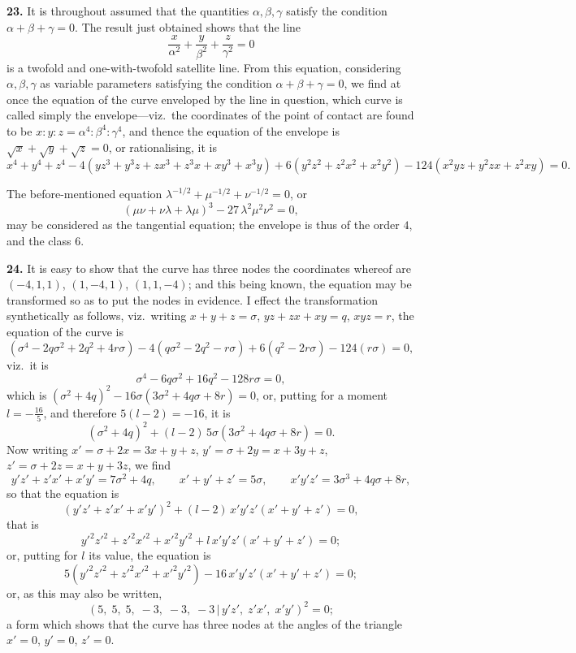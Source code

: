 \documentclass[11pt,a4paper]{article}
\providecommand{\mid}{\,|\,}
\begin{document}
\medskip

\textbf{23.} It is throughout assumed that the quantities $\alpha, \beta, \gamma$ satisfy the condition $\alpha + \beta + \gamma = 0$. The result just obtained shows that the line
\[
\frac{x}{\alpha^2} + \frac{y}{\beta^2} + \frac{z}{\gamma^2} = 0
\]
is a twofold and one-with-twofold satellite line. From this equation, considering $\alpha, \beta, \gamma$ as variable parameters satisfying the condition $\alpha + \beta + \gamma = 0$, we find at once the equation of the curve enveloped by the line in question, which curve is called simply the envelope---viz.\ the coordinates of the point of contact are found to be $x : y : z = \alpha^4 : \beta^4 : \gamma^4$, and thence the equation of the envelope is $\sqrt{x} + \sqrt{y} + \sqrt{z} = 0$, or rationalising, it is
\[
x^4 + y^4 + z^4 - 4(yz^3 + y^3 z + zx^3 + z^3 x + xy^3 + x^3 y) + 6(y^2 z^2 + z^2 x^2 + x^2 y^2) - 124(x^2 yz + y^2 zx + z^2 xy) = 0.
\]

The before-mentioned equation $\lambda^{-1/2} + \mu^{-1/2} + \nu^{-1/2} = 0$, or
\[
(\mu\nu + \nu\lambda + \lambda\mu)^3 - 27\,\lambda^2\mu^2\nu^2 = 0,
\]
may be considered as the tangential equation; the envelope is thus of the order $4$, and the class $6$.

\medskip

\textbf{24.} It is easy to show that the curve has three nodes the coordinates whereof are $(-4, 1, 1)$, $(1, -4, 1)$, $(1, 1, -4)$; and this being known, the equation may be transformed so as to put the nodes in evidence. I effect the transformation synthetically as follows, viz.\ writing $x + y + z = \sigma$, $yz + zx + xy = q$, $xyz = r$, the equation of the curve is
\[
(\sigma^4 - 2q\sigma^2 + 2q^2 + 4r\sigma) - 4(q\sigma^2 - 2q^2 - r\sigma) + 6(q^2 - 2r\sigma) - 124(r\sigma) = 0,
\]
viz.\ it is
\[
\sigma^4 - 6q\sigma^2 + 16q^2 - 128 r\sigma = 0,
\]
which is $(\sigma^2 + 4q)^2 - 16\sigma(3\sigma^2 + 4q\sigma + 8r) = 0$, or, putting for a moment $l = -\tfrac{16}{5}$, and therefore $5(l - 2) = -16$, it is
\[
(\sigma^2 + 4q)^2 + (l - 2)\,5\sigma(3\sigma^2 + 4q\sigma + 8r) = 0.
\]
Now writing $x' = \sigma + 2x = 3x + y + z$, $y' = \sigma + 2y = x + 3y + z$, $z' = \sigma + 2z = x + y + 3z$, we find
\[
y'z' + z'x' + x'y' = 7\sigma^2 + 4q,\qquad x' + y' + z' = 5\sigma,\qquad x'y'z' = 3\sigma^3 + 4q\sigma + 8r,
\]
so that the equation is
\[
(y'z' + z'x' + x'y')^2 + (l - 2)\,x'y'z'(x' + y' + z') = 0,
\]
that is
\[
y'^2 z'^2 + z'^2 x'^2 + x'^2 y'^2 + l\,x'y'z'(x' + y' + z') = 0;
\]
or, putting for $l$ its value, the equation is
\[
5(y'^2 z'^2 + z'^2 x'^2 + x'^2 y'^2) - 16\,x'y'z'(x' + y' + z') = 0;
\]
or, as this may also be written,
\[
(5,\;5,\;5,\;-3,\;-3,\;-3 \mid y'z',\;z'x',\;x'y')^2 = 0;
\]
a form which shows that the curve has three nodes at the angles of the triangle $x' = 0$, $y' = 0$, $z' = 0$.
\end{document}
